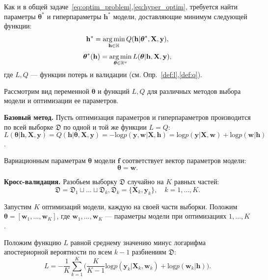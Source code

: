 Как и в общей задаче~\eqref{eq:optim_problem},\eqref{eq:hyper_optim}, 
требуется найти параметры ${\boldsymbol{\theta}}^{*}$ и гиперпараметры $\mathbf{h}^{*}$ модели, доставляющие минимум следующей функции:
\begin{equation}
\label{eq:main}
    \mathbf{h}^{*} = \operatorname*{arg\,min}_{\mathbf{h} \in \mathbb{H}} Q(\mathbf{h}|  \boldsymbol{\theta}^{*}, \mathbf{X}, \mathbf{y} ),
\end{equation}
\begin{equation}
\label{eq:main2}
	\boldsymbol{\theta}^{*}(\mathbf{h}) =  \operatorname*{arg\,min}_{\boldsymbol{\theta} \in \mathbb{R}^u} L(\boldsymbol{\theta}|  \mathbf{h},  \mathbf{X}, \mathbf{y}),
\end{equation}
где $L,Q$ --- функции потерь и валидации (см. Опр.~\ref{def:l},\ref{def:q}).

Рассмотрим вид переменной $\boldsymbol{\theta}$ и функций $L, Q$ для различных методов выбора модели и оптимизации ее параметров.

\textbf{Базовый метод. }
Пусть оптимизация параметров и гиперпараметров производится по всей выборке $\mathfrak{D}$ по одной и той же функции $L=Q$:
$$L(\boldsymbol{\theta}|  \mathbf{h},  \mathbf{X}, \mathbf{y}) = Q(\mathbf{h}|  \boldsymbol{\theta}, \mathbf{X}, \mathbf{y} ) = -\text{log}p(\mathbf{y}, \mathbf{w} | \mathbf{X}, \mathbf{h}) = \text{log} p(\mathbf{y}|\mathbf{X}, \mathbf{w})+\text{log}p(\mathbf{w}|\mathbf{h})$$.

Вариационным параметрам $\boldsymbol{\theta}$ модели $\mathbf{f}$  соответствует вектор параметров модели: 
\[
\boldsymbol{\theta} = \mathbf{w}.
\]

\textbf{Кросс-валидация. }
Разобьем выборку $\mathfrak{D}$ случайно на $K$ равных частей:
\[
\mathfrak{D} = \mathfrak{D}_1 \sqcup \dots \sqcup \mathfrak{D}_k, \mathfrak{D}_k = \{\mathbf{X}_k, \mathbf{y}_k\}, \quad k=1,\dots,K.
\]


Запустим $K$ оптимизаций модели, каждую на своей части выборки. Положим $\boldsymbol{\theta} = [\mathbf{w}_1, \dots, \mathbf{w}_K]$, где $\mathbf{w}_1, \dots, \mathbf{w}_K$ --- параметры модели при оптимизациях $1, \dots, K$.
 
Положим функцию $L$ равной  среднему значению минус логарифма апостериорной вероятности по всем $k-1$ разбиениям $\mathfrak{D}$:
\begin{equation}
L = -\frac{1}{K}\sum_{k=1}^K \bigl(\frac{K}{K-1}\text{log}p(\mathbf{y}_k|\mathbf{X}_k, \mathbf{w}_k) + \text{log}p(\mathbf{w}_k|\mathbf{h})\bigr).
\label{eq:cv}
\end{equation}

